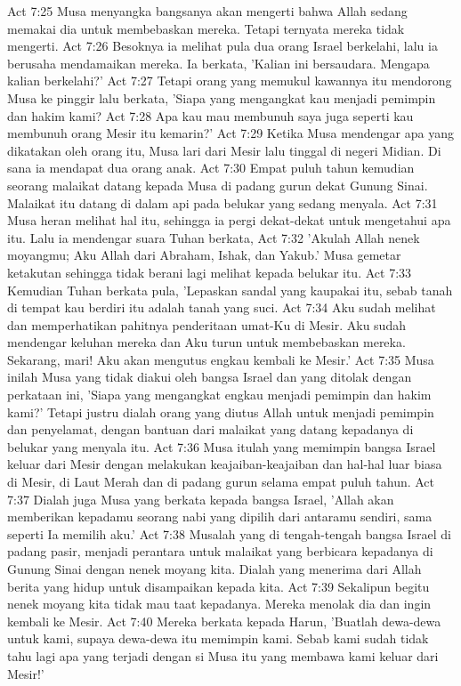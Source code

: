Act 7:25  Musa menyangka bangsanya akan mengerti bahwa Allah sedang memakai dia untuk membebaskan mereka. Tetapi ternyata mereka tidak mengerti.
Act 7:26  Besoknya ia melihat pula dua orang Israel berkelahi, lalu ia berusaha mendamaikan mereka. Ia berkata, 'Kalian ini bersaudara. Mengapa kalian berkelahi?'
Act 7:27  Tetapi orang yang memukul kawannya itu mendorong Musa ke pinggir lalu berkata, 'Siapa yang mengangkat kau menjadi pemimpin dan hakim kami?
Act 7:28  Apa kau mau membunuh saya juga seperti kau membunuh orang Mesir itu kemarin?'
Act 7:29  Ketika Musa mendengar apa yang dikatakan oleh orang itu, Musa lari dari Mesir lalu tinggal di negeri Midian. Di sana ia mendapat dua orang anak.
Act 7:30  Empat puluh tahun kemudian seorang malaikat datang kepada Musa di padang gurun dekat Gunung Sinai. Malaikat itu datang di dalam api pada belukar yang sedang menyala.
Act 7:31  Musa heran melihat hal itu, sehingga ia pergi dekat-dekat untuk mengetahui apa itu. Lalu ia mendengar suara Tuhan berkata,
Act 7:32  'Akulah Allah nenek moyangmu; Aku Allah dari Abraham, Ishak, dan Yakub.' Musa gemetar ketakutan sehingga tidak berani lagi melihat kepada belukar itu.
Act 7:33  Kemudian Tuhan berkata pula, 'Lepaskan sandal yang kaupakai itu, sebab tanah di tempat kau berdiri itu adalah tanah yang suci.
Act 7:34  Aku sudah melihat dan memperhatikan pahitnya penderitaan umat-Ku di Mesir. Aku sudah mendengar keluhan mereka dan Aku turun untuk membebaskan mereka. Sekarang, mari! Aku akan mengutus engkau kembali ke Mesir.'
Act 7:35  Musa inilah Musa yang tidak diakui oleh bangsa Israel dan yang ditolak dengan perkataan ini, 'Siapa yang mengangkat engkau menjadi pemimpin dan hakim kami?' Tetapi justru dialah orang yang diutus Allah untuk menjadi pemimpin dan penyelamat, dengan bantuan dari malaikat yang datang kepadanya di belukar yang menyala itu.
Act 7:36  Musa itulah yang memimpin bangsa Israel keluar dari Mesir dengan melakukan keajaiban-keajaiban dan hal-hal luar biasa di Mesir, di Laut Merah dan di padang gurun selama empat puluh tahun.
Act 7:37  Dialah juga Musa yang berkata kepada bangsa Israel, 'Allah akan memberikan kepadamu seorang nabi yang dipilih dari antaramu sendiri, sama seperti Ia memilih aku.'
Act 7:38  Musalah yang di tengah-tengah bangsa Israel di padang pasir, menjadi perantara untuk malaikat yang berbicara kepadanya di Gunung Sinai dengan nenek moyang kita. Dialah yang menerima dari Allah berita yang hidup untuk disampaikan kepada kita.
Act 7:39  Sekalipun begitu nenek moyang kita tidak mau taat kepadanya. Mereka menolak dia dan ingin kembali ke Mesir.
Act 7:40  Mereka berkata kepada Harun, 'Buatlah dewa-dewa untuk kami, supaya dewa-dewa itu memimpin kami. Sebab kami sudah tidak tahu lagi apa yang terjadi dengan si Musa itu yang membawa kami keluar dari Mesir!'
